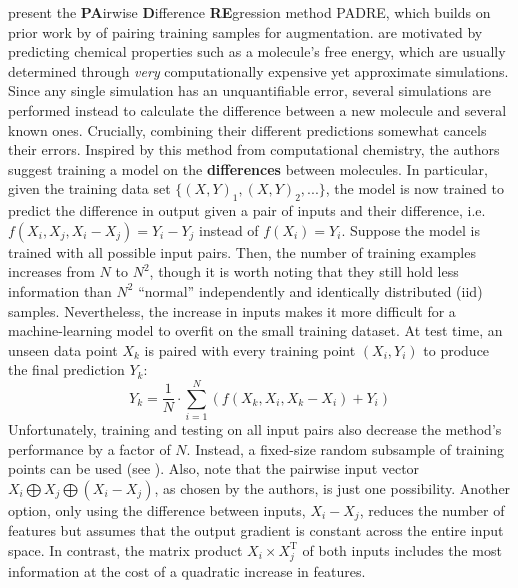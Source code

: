 \newpar \textcite{padre-rf-2021} present the \textbf{PA}irwise \textbf{D}ifference \textbf{RE}gression method PADRE, which builds on prior work by \textcite{pairwise-images-2018} of pairing training samples for augmentation. \citeauthor{padre-rf-2021} are motivated by predicting chemical properties such as a molecule's free energy, which are usually determined through \textit{very} computationally expensive yet approximate simulations. Since any single simulation has an unquantifiable error, several simulations are performed instead to calculate the difference between a new molecule and several known ones. Crucially, combining their different predictions somewhat cancels their errors. Inspired by this method from computational chemistry, the authors suggest training a model on the \textbf{differences} between molecules. In particular, given the training data set $\{ (X, Y)_1, (X, Y)_2, ... \}$, the model is now trained to predict the difference in output given a pair of inputs and their difference, i.e. $f(X_i, X_j, X_i - X_j) = Y_i - Y_j$ instead of $f(X_i) = Y_i$. Suppose the model is trained with all possible input pairs. Then, the number of training examples increases from $N$ to $N^2$, though it is worth noting that they still hold less information than $N^2$ ``normal'' independently and identically distributed (iid) samples. Nevertheless, the increase in inputs makes it more difficult for a machine-learning model to overfit on the small training dataset. At test time, an unseen data point $X_k$ is paired with every training point $(X_i, Y_i)$ to produce the final prediction $Y_k$:
\begin{equation*}
    Y_k = \frac{1}{N} \cdot \sum_{i=1}^{N}{\left(f(X_k, X_i, X_k - X_i) + Y_i \right)}
\end{equation*}
Unfortunately, training and testing on all input pairs also decrease the method's performance by a factor of $N$. Instead, a fixed-size random subsample of training points can be used (see ). Also, note that the pairwise input vector $X_i \bigoplus X_j \bigoplus (X_i - X_j)$, as chosen by the authors, is just one possibility. Another option, only using the difference between inputs, $X_i - X_j$, reduces the number of features but assumes that the output gradient is constant across the entire input space. In contrast, the matrix product $X_i \times X_{j}^{\text{T}}$ of both inputs includes the most information at the cost of a quadratic increase in features.

